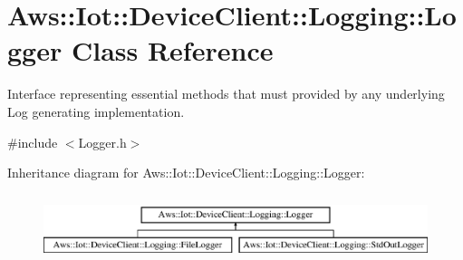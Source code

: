 \hypertarget{class_aws_1_1_iot_1_1_device_client_1_1_logging_1_1_logger}{}\section{Aws\+:\+:Iot\+:\+:Device\+Client\+:\+:Logging\+:\+:Logger Class Reference}
\label{class_aws_1_1_iot_1_1_device_client_1_1_logging_1_1_logger}


Interface representing essential methods that must provided by any underlying Log generating implementation.  




{\ttfamily \#include $<$Logger.\+h$>$}

Inheritance diagram for Aws\+:\+:Iot\+:\+:Device\+Client\+:\+:Logging\+:\+:Logger\+:\begin{figure}[H]
\begin{center}
\leavevmode
\includegraphics[height=2.000000cm]{class_aws_1_1_iot_1_1_device_client_1_1_logging_1_1_logger}
\end{center}
\end{figure}
